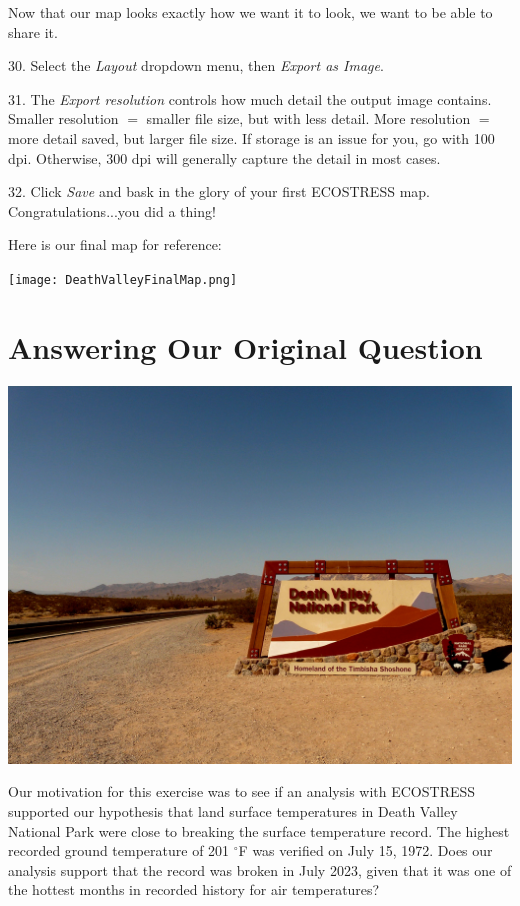 \documentclass[oneside,a4paper,11pt,explicit]{book}
\begin{document}
Now that our map looks exactly how we want it to look, we want to be able to share it.

30. Select the \textit{Layout} dropdown menu, then \textit{Export as Image}. 

31. The \textit{Export resolution} controls how much detail the output image contains. Smaller resolution $=$ smaller file size, but with less detail. More resolution $=$ more detail saved, but larger file size. If storage is an issue for you, go with 100 dpi. Otherwise, 300 dpi will generally capture the detail in most cases.

32. Click \textit{Save} and bask in the glory of your first ECOSTRESS map. Congratulations...you did a thing!


Here is our final map for reference: 

\centerline{\texttt{[image: DeathValleyFinalMap.png]}}

\section{Answering Our Original Question}

\centerline{\includegraphics[width=.675\textwidth]{DeathValleySign.jpg}}

Our motivation for this exercise was to see if an analysis with ECOSTRESS supported our hypothesis that land surface temperatures in Death Valley National Park were close to breaking the surface temperature record. The highest recorded ground temperature of 201 $^{\circ}$F was verified on July 15, 1972. Does our analysis support that the record was broken in July 2023, given that it was one of the hottest months in recorded history for air temperatures?
\end{document}
